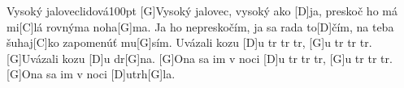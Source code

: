 \begin{song}{Vysoký jalovec}{lidová}{100pt}
[G]Vysoký jalovec, vysoký ako [D]ja,
preskoč ho má mi[C]lá rovnýma noha[G]ma.
Ja ho nepreskočím, ja sa rada to[D]{č}ím,
na teba šuhaj[C]ko zapomenúť mu[G]sím.
\smallskip
[G]Uvázali kozu [D]u tr tr tr, [G]u tr tr tr.
[G]Uvázali kozu [D]u dr[G]na.
[G]Ona sa im v noci [D]u tr tr tr, [G]u tr tr tr.
[G]Ona sa im v noci [D]utrh[G]la.
\end{song}
